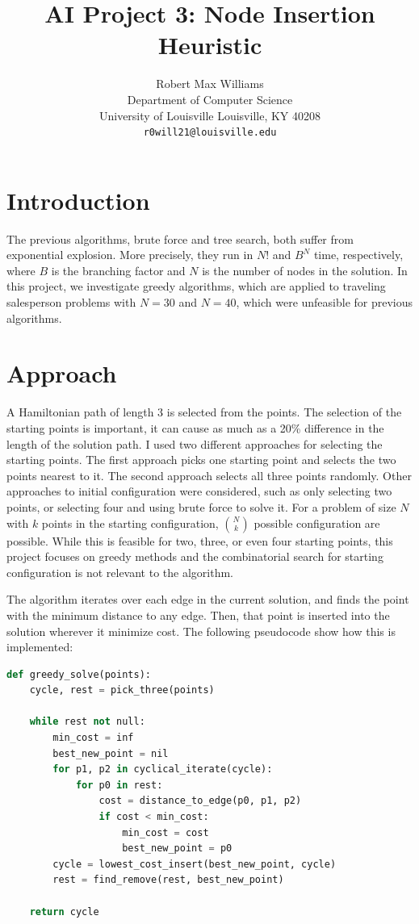 \documentclass{article}
\title{AI Project 3: Node Insertion Heuristic}
\author{
  Robert Max Williams\\
  Department of Computer Science\\
  University of Louisville
  Louisville, KY 40208 \\
  \texttt{r0will21@louisville.edu} \\
}
\begin{document}
\maketitle





\section{Introduction}

The previous algorithms, brute force and tree search, both suffer from exponential explosion. More precisely, they run
in $N!$ and $B^{N}$ time, respectively, where $B$ is the branching factor and $N$ is the number of nodes in the solution.
In this project, we investigate greedy algorithms, which are applied to traveling salesperson problems with
$N=30$ and $N=40$, which were unfeasible for previous algorithms.

\section{Approach}
\label{sec:approach}

A Hamiltonian path of length 3 is selected from the points. The selection of the starting points is important, it can cause as
much as a 20\% difference in the length of the solution path. I used two different approaches for selecting the starting
points. The first approach picks one starting point and selects the two points nearest to it. The second approach
selects all three points randomly. Other approaches to initial configuration were considered, such as only selecting two
points, or selecting four and using brute force to solve it. For a problem of size $N$ with $k$ points in the starting
configuration, $N \choose k$ possible configuration are possible. While this is feasible for two, three, or even four
starting points, this project focuses on greedy methods and the combinatorial search for starting configuration is not
relevant to the algorithm. 

The algorithm iterates over each edge in the current solution, and finds the point with the minimum distance to any
edge. Then, that point is inserted into the solution wherever it minimize cost. The following pseudocode show how this
is implemented:

\begin{lstlisting}[language=Python]
def greedy_solve(points):
    cycle, rest = pick_three(points)
    
    while rest not null:
        min_cost = inf
        best_new_point = nil
        for p1, p2 in cyclical_iterate(cycle):
            for p0 in rest:
                cost = distance_to_edge(p0, p1, p2)
                if cost < min_cost:
                    min_cost = cost
                    best_new_point = p0
        cycle = lowest_cost_insert(best_new_point, cycle)
        rest = find_remove(rest, best_new_point)

    return cycle
\end{lstlisting}
\end{document}
